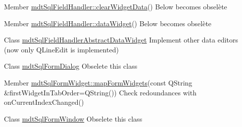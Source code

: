 \label{todo__todo000087}
\hypertarget{todo__todo000087}{}
 
\begin{DoxyDescription}
\item[Member \hyperlink{classmdt_sql_field_handler_ad482be9d476c3310373078a6cd949714}{mdtSqlFieldHandler::clearWidgetData}() ]Below becomes obselète 
\end{DoxyDescription}

\label{todo__todo000086}
\hypertarget{todo__todo000086}{}
 
\begin{DoxyDescription}
\item[Member \hyperlink{classmdt_sql_field_handler_a91ab8160d5015b6030e7169ab7108d33}{mdtSqlFieldHandler::dataWidget}() ]Below becomes obselète 
\end{DoxyDescription}

\label{todo__todo000085}
\hypertarget{todo__todo000085}{}
 
\begin{DoxyDescription}
\item[Class \hyperlink{classmdt_sql_field_handler_abstract_data_widget}{mdtSqlFieldHandlerAbstractDataWidget} ]Implement other data editors (now only QLineEdit is implemented) 
\end{DoxyDescription}

\label{todo__todo000088}
\hypertarget{todo__todo000088}{}
 
\begin{DoxyDescription}
\item[Class \hyperlink{classmdt_sql_form_dialog}{mdtSqlFormDialog} ]Obselete this class 
\end{DoxyDescription}

\label{todo__todo000089}
\hypertarget{todo__todo000089}{}
 
\begin{DoxyDescription}
\item[Member \hyperlink{classmdt_sql_form_widget_ace4f7fad749a4efe1233b61d071b3926}{mdtSqlFormWidget::mapFormWidgets}(const QString \&firstWidgetInTabOrder=QString()) ]Check redoundances with onCurrentIndexChanged() 
\end{DoxyDescription}

\label{todo__todo000090}
\hypertarget{todo__todo000090}{}
 
\begin{DoxyDescription}
\item[Class \hyperlink{classmdt_sql_form_window}{mdtSqlFormWindow} ]Obselete this class 
\end{DoxyDescription}

